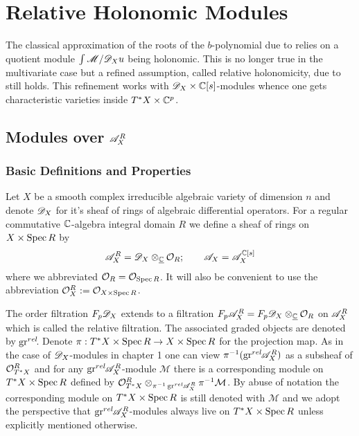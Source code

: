 \chapter{Relative Holonomic Modules}

The classical approximation of the roots of the $b$-polynomial due to \cite{kashiwara1976b} relies on a quotient module $\int \mathscr{M} / \mathscr{D}_X u$ being holonomic.
This is no longer true in the multivariate case but a refined assumption, called relative holonomicity, due to \cite{maisonobe2016filtration} still holds.
This refinement works with $\mathscr{D}_X\times\mathbb{C}[s]$-modules whence one gets characteristic varieties inside $T^*X \times \mathbb{C}^p$.

\section{Modules over $\mathscr{A}_X^R$}
\subsection{Basic Definitions and Properties}
Let $X$ be a smooth complex irreducible algebraic variety of dimension $n$ and denote $\mathscr{D}_X$ for it's sheaf of rings of algebraic differential operators.
For a regular commutative $\mathbb{C}$-algebra integral domain $R$ we define a sheaf of rings on $X\times \operatorname{Spec} R$ by
$$\mathscr{A}_{X}^R = \mathscr{D}_X \otimes_{\underline{\mathbb{C}}} \mathcal{O}_{R}; \qquad \mathscr{A}_X = \mathscr{A}_{X}^{\mathbb{C}[s]}$$
where we abbreviated $\mathcal{O}_R = \mathcal{O}_{\operatorname{Spec} R}$. It will also be convenient to use the abbreviation $\mathcal{O}_{X}^R := \mathcal{O}_{X \times \operatorname{Spec} R}$.


The order filtration $F_p\mathscr{D}_X$ extends to a filtration $F_p\mathscr{A}^R_X = F_p\mathscr{D}_X \otimes_{\underline{\mathbb{C}}} \mathcal{O}_R$ on $\mathscr{A}^R_X$ which is called the relative filtration.
The associated graded objects are denoted by $\operatorname{gr}^{rel}\mkern-5mu$. Denote $\pi:T^*X\times \operatorname{Spec} R \to X\times \operatorname{Spec} R$ for the projection map.
As in the case of $\mathscr{D}_X$-modules in chapter 1  one can view $\pi^{-1}(\operatorname{gr}^{rel}\mkern-5mu\mathscr{A}_X^R)$ as a subsheaf of $\mathcal{O}_{T^*X}^R$ and for any $\operatorname{gr}^{rel}\mkern-5mu\mathscr{A}_X^R$-module $\mathcal{M}$ there is a corresponding module on $T^*X\times \operatorname{Spec} R$ defined by $\mathcal{O}_{T^*X}^R\otimes_{\pi^{-1}\operatorname{gr}^{rel}\mkern-5mu\mathscr{A}_X^R}\pi^{-1}\mathcal{M}$.
By abuse of notation the corresponding module on $T^*X\times \operatorname{Spec} R$ is still denoted with $\mathcal{M}$ and we adopt the perspective that $\operatorname{gr}^{rel}\mkern-5mu\mathscr{A}_X^R$-modules always live on $T^*X\times \operatorname{Spec} R$ unless explicitly mentioned otherwise.


